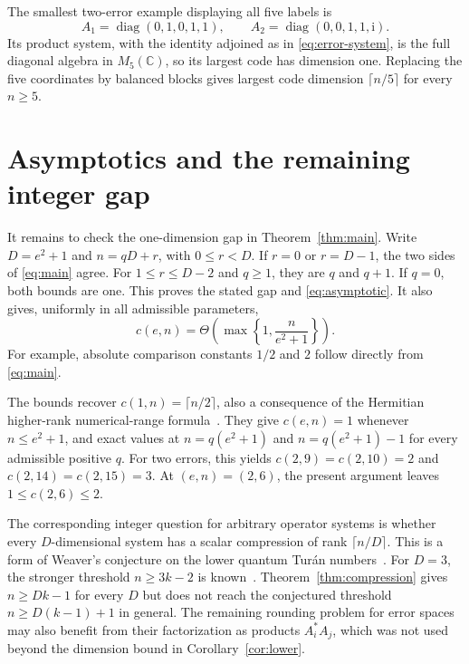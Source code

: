 \documentclass[11pt]{article}
\newcommand{\C}{\mathbb C}
\theoremstyle{remark}
\numberwithin{equation}{section}
\begin{document}
The smallest two-error example displaying all five labels is
\begin{equation}\label{eq:five-block-example}
 A_1=\operatorname{diag}(0,1,0,1,1),\qquad
 A_2=\operatorname{diag}(0,0,1,1,\mathrm{i}).
\end{equation}
Its product system, with the identity adjoined as in
\eqref{eq:error-system}, is the full diagonal algebra in $M_5(\C)$,
so its largest code has dimension one. Replacing the five coordinates
by balanced blocks gives largest code dimension $\lceil n/5\rceil$
for every $n\ge5$.

\section{Asymptotics and the remaining integer gap}

It remains to check the one-dimension gap in Theorem~\ref{thm:main}.
Write $D=e^2+1$ and $n=qD+r$, with $0\le r<D$.
If $r=0$ or $r=D-1$, the two sides of \eqref{eq:main} agree.
For $1\le r\le D-2$ and $q\ge1$, they are $q$ and $q+1$.
If $q=0$, both bounds are one. This proves the stated gap and
\eqref{eq:asymptotic}.
It also gives, uniformly in all admissible parameters,
\begin{equation}\label{eq:uniform-scale}
 c(e,n)=\Theta\!\left(\max\!\left\{1,\frac{n}{e^2+1}\right\}\right).
\end{equation}
For example, absolute comparison constants $1/2$ and $2$ follow
directly from \eqref{eq:main}.

The bounds recover $c(1,n)=\lceil n/2\rceil$, also a consequence of
the Hermitian higher-rank numerical-range formula~\cite{CKZ}.
They give $c(e,n)=1$ whenever $n\le e^2+1$, and exact values at
$n=q(e^2+1)$ and $n=q(e^2+1)-1$ for every admissible positive $q$.
For two errors, this yields $c(2,9)=c(2,10)=2$ and
$c(2,14)=c(2,15)=3$. At $(e,n)=(2,6)$, the present argument leaves
$1\le c(2,6)\le2$.

The corresponding integer question for arbitrary operator systems is
whether every $D$-dimensional system has a scalar compression of rank
$\lceil n/D\rceil$. This is a form of Weaver's conjecture on the lower
quantum Tur\'an numbers~\cite[following Theorem~2.11]{Weaver}.
For $D=3$, the stronger threshold $n\ge3k-2$ is known~\cite[Lemma~2.3]{AK}.
Theorem~\ref{thm:compression} gives $n\ge Dk-1$ for every $D$ but does
not reach the conjectured threshold $n\ge D(k-1)+1$ in general.
The remaining rounding problem for error spaces may also benefit from
their factorization as products $A_i^*A_j$, which was not used beyond
the dimension bound in Corollary~\ref{cor:lower}.
\end{document}
